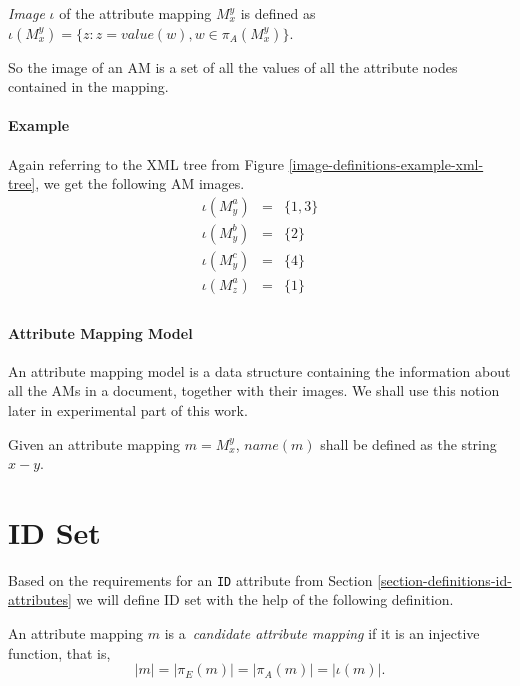 \begin{define}
	\textit{Image} $\iota$ of the attribute mapping $M_{x}^{y}$ is defined as $\iota(M_{x}^{y}) = \{z: z = value(w), w \in \pi_A(M_{x}^{y})\}$.
\end{define}

So the image of an AM is a set of all the values of all the attribute nodes contained in the mapping.

\paragraph{Example}
Again referring to the XML tree from Figure \ref{image-definitions-example-xml-tree}, we get the following AM images.
\begin{eqnarray*}
\iota(M_{y}^{a}) & = & \{1, 3\} \\
\iota(M_{y}^{b}) & = & \{2\} \\
\iota(M_{y}^{c}) & = & \{4\} \\
\iota(M_{z}^{a}) & = & \{1\} \\
\end{eqnarray*}

\paragraph{Attribute Mapping Model}
An attribute mapping model is a data structure containing the information about all the AMs in a document, together with their images. We shall use this notion later in experimental part of this work.

\begin{define}[$name()$]
	Given an attribute mapping $m = M_{x}^{y}$, $name(m)$ shall be defined as the string $x-y$.
\end{define}

\section{ID Set}
\label{section-definitions-id-set}

Based on the requirements for an \texttt{ID} attribute from Section \ref{section-definitions-id-attributes} we will define ID set with the help of the following definition.

\begin{define}
An attribute mapping $m$ is a~\textit{candidate attribute mapping} if it is an injective function, that is,
\[|m| = |\pi_E(m)| = |\pi_A(m)| = |\iota(m)|.\]
\end{define}

